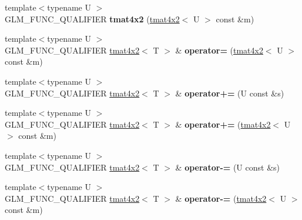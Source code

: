\begin{DoxyCompactItemize}
\item 
\hypertarget{structglm_1_1detail_1_1tmat4x2_a410520189e090aec0b69fc9d29a96fb4}{{\footnotesize template$<$typename U $>$ }\\G\-L\-M\-\_\-\-F\-U\-N\-C\-\_\-\-Q\-U\-A\-L\-I\-F\-I\-E\-R {\bfseries tmat4x2} (\hyperlink{structglm_1_1detail_1_1tmat4x2}{tmat4x2}$<$ U $>$ const \&m)}\label{structglm_1_1detail_1_1tmat4x2_a410520189e090aec0b69fc9d29a96fb4}

\item 
\hypertarget{structglm_1_1detail_1_1tmat4x2_a22085e9d4dbabdf4375008e544336b7b}{{\footnotesize template$<$typename U $>$ }\\G\-L\-M\-\_\-\-F\-U\-N\-C\-\_\-\-Q\-U\-A\-L\-I\-F\-I\-E\-R \hyperlink{structglm_1_1detail_1_1tmat4x2}{tmat4x2}$<$ T $>$ \& {\bfseries operator=} (\hyperlink{structglm_1_1detail_1_1tmat4x2}{tmat4x2}$<$ U $>$ const \&m)}\label{structglm_1_1detail_1_1tmat4x2_a22085e9d4dbabdf4375008e544336b7b}

\item 
\hypertarget{structglm_1_1detail_1_1tmat4x2_a86666c2f75792c38b915e1619c88b254}{{\footnotesize template$<$typename U $>$ }\\G\-L\-M\-\_\-\-F\-U\-N\-C\-\_\-\-Q\-U\-A\-L\-I\-F\-I\-E\-R \hyperlink{structglm_1_1detail_1_1tmat4x2}{tmat4x2}$<$ T $>$ \& {\bfseries operator+=} (U const \&s)}\label{structglm_1_1detail_1_1tmat4x2_a86666c2f75792c38b915e1619c88b254}

\item 
\hypertarget{structglm_1_1detail_1_1tmat4x2_afce1257e8143d2f4b3db5dadcf0ccec2}{{\footnotesize template$<$typename U $>$ }\\G\-L\-M\-\_\-\-F\-U\-N\-C\-\_\-\-Q\-U\-A\-L\-I\-F\-I\-E\-R \hyperlink{structglm_1_1detail_1_1tmat4x2}{tmat4x2}$<$ T $>$ \& {\bfseries operator+=} (\hyperlink{structglm_1_1detail_1_1tmat4x2}{tmat4x2}$<$ U $>$ const \&m)}\label{structglm_1_1detail_1_1tmat4x2_afce1257e8143d2f4b3db5dadcf0ccec2}

\item 
\hypertarget{structglm_1_1detail_1_1tmat4x2_a5e7bfc69bf41ec3a50c601d1799df414}{{\footnotesize template$<$typename U $>$ }\\G\-L\-M\-\_\-\-F\-U\-N\-C\-\_\-\-Q\-U\-A\-L\-I\-F\-I\-E\-R \hyperlink{structglm_1_1detail_1_1tmat4x2}{tmat4x2}$<$ T $>$ \& {\bfseries operator-\/=} (U const \&s)}\label{structglm_1_1detail_1_1tmat4x2_a5e7bfc69bf41ec3a50c601d1799df414}

\item 
\hypertarget{structglm_1_1detail_1_1tmat4x2_ab94005c56c37075bd5ef5c40961d8df1}{{\footnotesize template$<$typename U $>$ }\\G\-L\-M\-\_\-\-F\-U\-N\-C\-\_\-\-Q\-U\-A\-L\-I\-F\-I\-E\-R \hyperlink{structglm_1_1detail_1_1tmat4x2}{tmat4x2}$<$ T $>$ \& {\bfseries operator-\/=} (\hyperlink{structglm_1_1detail_1_1tmat4x2}{tmat4x2}$<$ U $>$ const \&m)}\label{structglm_1_1detail_1_1tmat4x2_ab94005c56c37075bd5ef5c40961d8df1}


\end{DoxyCompactItemize}
